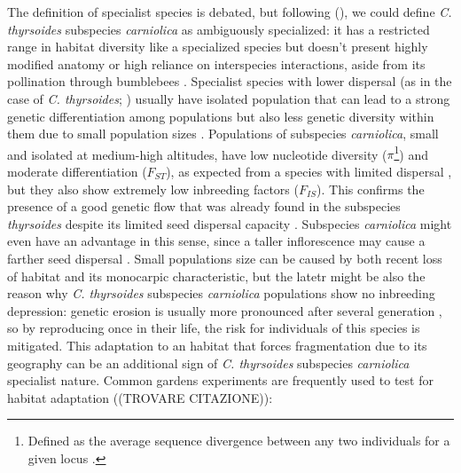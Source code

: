 \documentclass[a4paper, 12pt]{report}
\begin{document}
The definition of specialist species is debated, but following \citeauthor{kirschDefiningPlantEcological2022} (\citeyear{kirschDefiningPlantEcological2022}), we could define \textit{C. thyrsoides} subspecies \textit{carniolica} as ambiguously specialized: it has a restricted range in habitat diversity \parencite{aegisdottirIsolatedPopulationsRare2009} like a specialized species but doesn't present highly modified anatomy \parencite{scheepensDifferentiationMorphologyFlowering2011} or high reliance on interspecies interactions, aside from its pollination through bumblebees \parencite{kussBiologicalFloraCentral2007}. Specialist species with lower dispersal (as in the case of \textit{C. thyrsoides}; \cite{aegisdottirIsolatedPopulationsRare2009}) usually have isolated population that can lead to a strong genetic differentiation among populations but also less genetic diversity within them due to small population sizes \parencite{hughesStrongGeneticStructuring1999}. Populations of subspecies \textit{carniolica}, small and isolated at medium-high altitudes, have low nucleotide diversity ($\pi$\footnote{Defined as the average sequence divergence between any two individuals for a given locus \parencite{bucklerPlantMolecularDiversity2002}.}) and moderate differentiation ($F_{ST}$), as expected from a species with limited dispersal \parencite{hughesStrongGeneticStructuring1999}, but they also show extremely low inbreeding factors ($F_{IS}$). This confirms the presence of a good genetic flow that was already found in the subspecies \textit{thyrsoides} despite its limited seed dispersal capacity \parencite{aegisdottirIsolatedPopulationsRare2009}. Subspecies \textit{carniolica} might even have an advantage in this sense, since a taller inflorescence may cause a farther seed dispersal \parencite{scheepensDifferentiationMorphologyFlowering2011}. Small populations size can be caused by both recent loss of habitat \parencite{yinPlantConservationAge2024} and its monocarpic characteristic, but the latetr might be also the reason why \textit{C. thyrsoides} subspecies \textit{carniolica} populations show no inbreeding depression: genetic erosion is usually more pronounced after several generation \parencite{aguilarGeneticConsequencesHabitat2008}, so by reproducing once in their life, the risk for individuals of this species is mitigated. This adaptation to an habitat that forces fragmentation due to its geography \parencite{aegisdottirNoInbreedingDepression2007} can be an additional sign of \textit{C. thyrsoides} subspecies \textit{carniolica} specialist nature. Common gardens experiments are frequently used to test for habitat adaptation ((TROVARE CITAZIONE)): 
\end{document}
